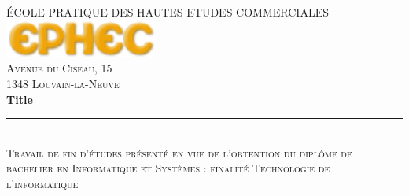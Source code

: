 \begin{titlepage}
\newcommand{\HRule}{\rule{\linewidth}{0.5mm}} %

\center %
 

\textsc{\large ÉCOLE PRATIQUE DES HAUTES ETUDES COMMERCIALES}\\[1.5cm] %


\includegraphics[width=5cm]{ephec.png}\\[1cm] %
 

\textsc{Avenue du Ciseau, 15}\\[0.5cm] %
\textsc{1348 Louvain-la-Neuve}\\[1.5cm] %


{ \huge \bfseries Title}\\[0.4cm] %
\HRule \\[0.4cm]
\textsc{\small Travail de fin d'études présenté en vue de l'obtention du diplôme de bachelier en Informatique et Systèmes : finalité Technologie de l'informatique}\\[1.5cm] %
 


\end{titlepage}
